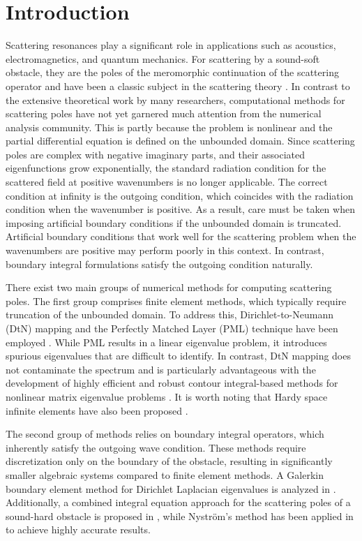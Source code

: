 \documentclass{article}
\begin{document}
	\section{Introduction}
	Scattering resonances play a significant role in applications such as acoustics, electromagnetics, and quantum mechanics. For scattering by a sound-soft obstacle, they are the poles of the meromorphic continuation of the scattering operator and have been a classic subject in the scattering theory \cite{LaxPhillips1989, Taylor1996, Labreuche1998siamJAM, Ralston1972CPAM, SemyonMaciej}. In contrast to the extensive theoretical work by many researchers, computational methods for scattering poles have not yet garnered much attention from the numerical analysis community. This is partly because the problem is nonlinear and the partial differential equation is defined on the unbounded domain. Since scattering poles are complex with negative imaginary parts, and their associated eigenfunctions grow exponentially, the standard radiation condition for the scattered field at positive wavenumbers is no longer applicable. The correct condition at infinity is the outgoing condition, which coincides with the radiation condition when the wavenumber is positive. As a result, care must be taken when imposing artificial boundary conditions if the unbounded domain is truncated. Artificial boundary conditions that work well for the scattering problem when the wavenumbers are positive may perform poorly in this context. In contrast, boundary integral formulations satisfy the outgoing condition naturally.
	
	There exist two main groups of numerical methods for computing scattering poles. The first group comprises finite element methods, which typically require truncation of the unbounded domain. To address this, Dirichlet-to-Neumann (DtN) mapping and the Perfectly Matched Layer (PML) technique have been employed \cite{Lenoir1992, KimPasciak2009MC, NannenWess2018BIT, XiLinSun2024, XiGongSun2024}. While PML results in a linear eigenvalue problem, it introduces spurious eigenvalues that are difficult to identify. In contrast, DtN mapping does not contaminate the spectrum and is particularly advantageous with the development of highly efficient and robust contour integral-based methods for nonlinear matrix eigenvalue problems \cite{Beyn2012LAA, HuangEtal2016JCP, SunZhou2016, ChenSunXia2024, XiSun2024arXiv}. It is worth noting that Hardy space infinite elements have also been proposed \cite{HohageNannen2009}.
	
	The second group of methods relies on boundary integral operators, which inherently satisfy the outgoing wave condition. These methods require discretization only on the boundary of the obstacle, resulting in significantly smaller algebraic systems compared to finite element methods. A Galerkin boundary element method for Dirichlet Laplacian eigenvalues is analyzed in \cite{SteinbachUnger2012}. Additionally, a combined integral equation approach for the scattering poles of a sound-hard obstacle is proposed in \cite{OlafUnger2017MMAS}, while Nystr\"{o}m's method has been applied in \cite{MaSun2023AML} to achieve highly accurate results.
	
\end{document}
